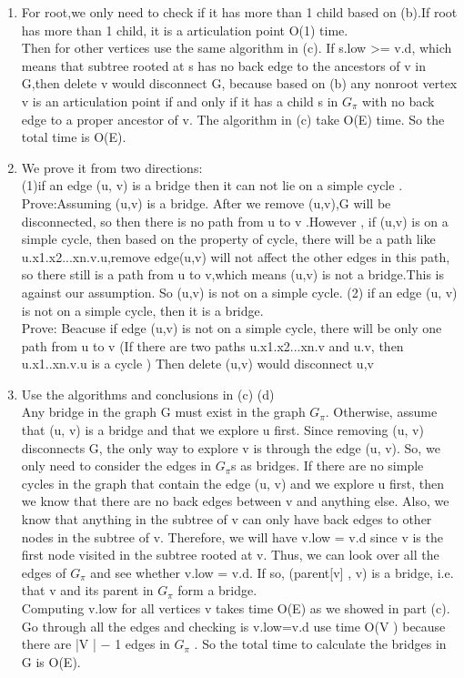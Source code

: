\documentclass[paper=a4, fontsize=11pt]{scrartcl} %
\numberwithin{equation}{section} %
\numberwithin{figure}{section} %
\numberwithin{table}{section} %
\begin{document}
\begin{enumerate}[label={2.(\alph*)}]
  \item 
For root,we only need to check if it has more than 1 child based on (b).If root has more than 1 child, it is a articulation point
O(1) time.\\
Then for other vertices  use the same algorithm in (c). If s.low >= v.d, which means that subtree rooted at s has no back edge to  the ancestors of v in G,then delete v would disconnect G, because based on (b)  any nonroot vertex v is an articulation point if and only if it has a child s in  ${G_\pi}$ with no back edge to a proper ancestor of v. The algorithm in (c) take O(E) time.
So the total time is O(E).

  \item 
We prove it from two directions:\\
(1)if an edge (u, v) is a bridge then it can not lie on a simple cycle .\\
Prove:Assuming (u,v) is a bridge. After we  remove (u,v),G  will be disconnected, so  then there is no path from u to v .However , if (u,v) is on a simple cycle, then based on the property of cycle, there will be a path like u.x1.x2...xn.v.u,remove edge(u,v) will not affect the other edges in this path, so there still is a path from u to v,which means (u,v) is not a bridge.This is against our assumption. So (u,v) is not on a simple cycle.  
(2) if an edge (u, v) is not on a simple cycle, then it is a bridge.\\
Prove: Beacuse if edge (u,v) is not on a simple cycle, there will be only one path from u to v (If there are two paths u.x1.x2...xn.v and  u.v, then u.x1..xn.v.u is a cycle ) Then delete (u,v) would disconnect u,v 


  \item 
Use the algorithms and conclusions in (c)  (d)\\
Any bridge in the graph G must exist in the graph ${G_\pi}$. Otherwise, assume that (u, v) is a bridge and that we explore u first. Since removing (u, v) disconnects G, the only way to explore v is through the edge (u, v). So, we only need to consider the edges in ${G_\pi}$s as bridges. If there are no simple cycles in the graph that contain the edge (u, v) and we explore u first, then we know that there are no back edges between v and anything else. Also, we know that anything
in the subtree of v can only have back edges to other nodes in the subtree of v. Therefore, we will have v.low = v.d since v is the first node visited in the subtree rooted at v. Thus, we can look over all the edges of ${G_\pi}$ and see whether v.low = v.d. If so,  (parent[v] , v) is a bridge, i.e. that v and its parent in ${G_\pi}$ form a bridge.\\
 Computing v.low for all vertices v takes time O(E) as we showed in part (c). Go through all the edges and checking is v.low=v.d use time O(V ) because  there are  |V | − 1 edges in ${G_\pi}$ . So the total time to calculate the bridges in G is O(E).



\end{enumerate}
\end{document}

